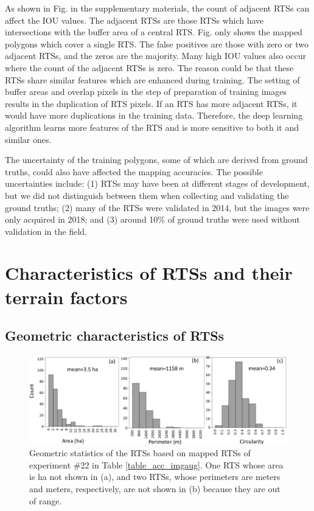 \documentclass[authoryear,preprint,review,12pt]{elsarticle}
\begin{document}
As shown in Fig.  in the supplementary materials, the count of adjacent RTSs can affect the IOU values. The adjacent RTSs are those RTSs which have intersections with the buffer area of a central RTS. Fig.  only shows the mapped polygons which cover a single RTS. The false positives are those with zero or two adjacent RTSs, and the zeros are the majority. Many high IOU values also occur where the count of the adjacent RTSs is zero. The reason could be that these RTSs share similar features which are enhanced during training. The setting of buffer areas and overlap pixels in the step of preparation of training images results in the duplication of RTS pixels. If an RTS has more adjacent RTSs, it would have more duplications in the training data. Therefore, the deep learning algorithm learns more features of the RTS and is more sensitive to both it and similar ones. 

The uncertainty of the training polygons, some of which are derived from ground truths, could also have affected the mapping accuracies. The possible uncertainties include: (1) RTSs may have been at different stages of development, but we did not distinguish between them when collecting and validating the ground truths; (2) many of the RTSs were validated in 2014, but the images were only acquired in 2018; and (3) around 10\% of ground truths were used without validation in the field. 


\section{Characteristics of RTSs and their terrain factors}
\label{sec_spatial_terrain}


\subsection{Geometric characteristics of RTSs}
\label{subsec_geo_charac}

\begin{figure}
	\centering
	\includegraphics[width=14cm]{figures/geometric_var_mapped_trim.jpg}
	\caption{Geometric statistics of the RTSs based on mapped RTSs of experiment \#22 in Table \ref{table_acc_imgaug}. One RTS whose area is  ha not shown in (a), and two RTSs, whose perimeters are  meters and  meters, respectively, are not shown in (b) because they are out of range. }
	\label{fig_geometric_statistics}
\end{figure}
\end{document}
